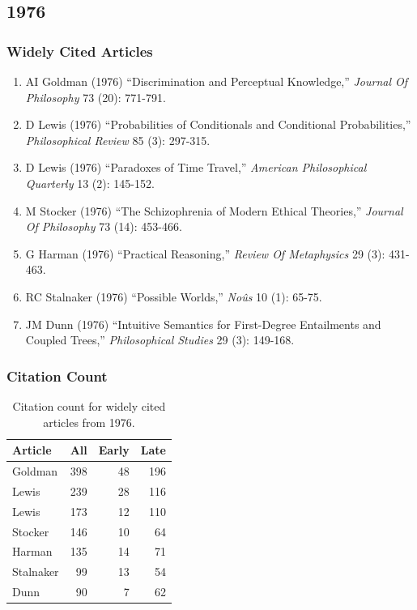 \documentclass[
  10pt,
  letterpaper,
  DIV=11,
  numbers=noendperiod,
  twoside]{scrartcl}
\providecommand{\tightlist}{%
  \setlength{\itemsep}{0pt}\setlength{\parskip}{0pt}}\usepackage{longtable,booktabs,array}
\begin{document}
\newpage

\subsection{1976}\label{sec-s1976}

\subsubsection*{Widely Cited Articles}\label{widely-cited-articles-20}

\begin{enumerate}
\def\labelenumi{\arabic{enumi}.}
\tightlist
\item
  AI Goldman (1976) ``Discrimination and Perceptual Knowledge,''
  \emph{Journal Of Philosophy} 73 (20): 771-791.
\item
  D Lewis (1976) ``Probabilities of Conditionals and Conditional
  Probabilities,'' \emph{Philosophical Review} 85 (3): 297-315.
\item
  D Lewis (1976) ``Paradoxes of Time Travel,'' \emph{American
  Philosophical Quarterly} 13 (2): 145-152.
\item
  M Stocker (1976) ``The Schizophrenia of Modern Ethical Theories,''
  \emph{Journal Of Philosophy} 73 (14): 453-466.
\item
  G Harman (1976) ``Practical Reasoning,'' \emph{Review Of Metaphysics}
  29 (3): 431-463.
\item
  RC Stalnaker (1976) ``Possible Worlds,'' \emph{Noûs} 10 (1): 65-75.
\item
  JM Dunn (1976) ``Intuitive Semantics for First-Degree Entailments and
  Coupled Trees,'' \emph{Philosophical Studies} 29 (3): 149-168.
\end{enumerate}

\subsubsection*{Citation Count}\label{sec-count-1976}

\begin{longtable}[]{@{}lrrr@{}}

\caption{\label{tbl-citation-count-1976}Citation count for widely cited
articles from 1976.}

\tabularnewline

\toprule\noalign{}
Article & All & Early & Late \\
\midrule\noalign{}
\endhead
\bottomrule\noalign{}
\endlastfoot
Goldman & 398 & 48 & 196 \\
Lewis & 239 & 28 & 116 \\
Lewis & 173 & 12 & 110 \\
Stocker & 146 & 10 & 64 \\
Harman & 135 & 14 & 71 \\
Stalnaker & 99 & 13 & 54 \\
Dunn & 90 & 7 & 62 \\

\end{longtable}
\end{document}
